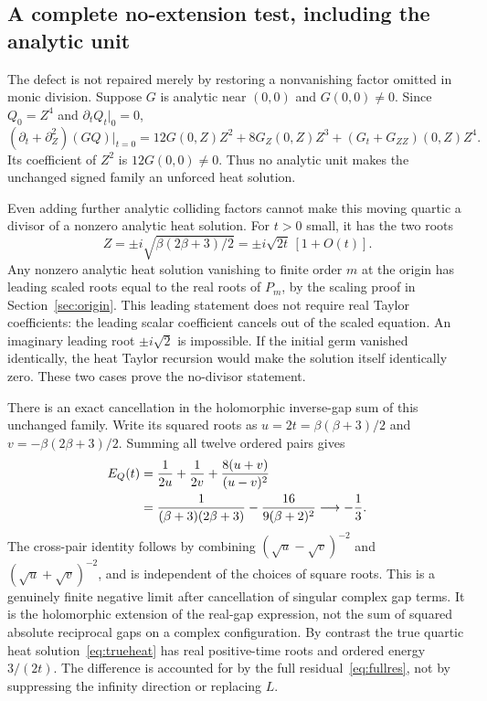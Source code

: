 \documentclass[11pt,a4paper]{article}
\theoremstyle{definition}\newtheorem{definition}[theorem]{Definition}\newtheorem{remark}[theorem]{Remark}
\begin{document}
\subsection{A complete no-extension test, including the analytic unit}
The defect is not repaired merely by restoring a nonvanishing factor omitted in monic division. Suppose $G$ is analytic near $(0,0)$ and $G(0,0)\ne0$. Since $Q_0=Z^4$ and $\partial_tQ_t|_0=0$,
\begin{equation}
 (\partial_t+\partial_Z^2)(GQ)\big|_{t=0}
 =12G(0,Z)Z^2+8G_Z(0,Z)Z^3+(G_t+G_{ZZ})(0,Z)Z^4.
                                                        \label{eq:unitobstruction}
\end{equation}
Its coefficient of $Z^2$ is $12G(0,0)\ne0$. Thus no analytic unit makes the unchanged signed family an unforced heat solution.

Even adding further analytic colliding factors cannot make this moving quartic a divisor of a nonzero analytic heat solution. For $t>0$ small, it has the two roots
\[
 Z=\pm i\sqrt{\beta(2\beta+3)/2}=\pm i\sqrt{2t}\,[1+O(t)].
\]
Any nonzero analytic heat solution vanishing to finite order $m$ at the origin has leading scaled roots equal to the real roots of $P_m$, by the scaling proof in Section~\ref{sec:origin}. This leading statement does not require real Taylor coefficients: the leading scalar coefficient cancels out of the scaled equation. An imaginary leading root $\pm i\sqrt2$ is impossible. If the initial germ vanished identically, the heat Taylor recursion would make the solution itself identically zero. These two cases prove the no-divisor statement.

There is an exact cancellation in the holomorphic inverse-gap sum of this unchanged family. Write its squared roots as $u=2t=\beta(\beta+3)/2$ and $v=-\beta(2\beta+3)/2$. Summing all twelve ordered pairs gives
\begin{align}
 E_Q(t)&=\frac1{2u}+\frac1{2v}+\frac{8(u+v)}{(u-v)^2}\notag\\
       &=\frac1{(\beta+3)(2\beta+3)}-\frac{16}{9(\beta+2)^2}
         \longrightarrow-\frac13.                      \label{eq:energycancel}
\end{align}
The cross-pair identity follows by combining $(\sqrt u-\sqrt v)^{-2}$ and $(\sqrt u+\sqrt v)^{-2}$, and is independent of the choices of square roots. This is a genuinely finite negative limit after cancellation of singular complex gap terms. It is the holomorphic extension of the real-gap expression, not the sum of squared absolute reciprocal gaps on a complex configuration. By contrast the true quartic heat solution~\eqref{eq:trueheat} has real positive-time roots and ordered energy $3/(2t)$. The difference is accounted for by the full residual~\eqref{eq:fullres}, not by suppressing the infinity direction or replacing $L$.
\end{document}
